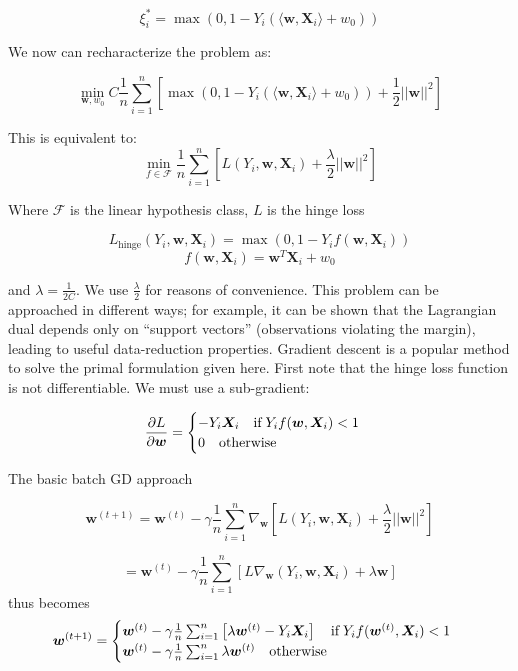 \documentclass{article}
\begin{document}
$$
\xi_i^* = \max(0, 1 - Y_i(\langle \bm{w}, \bm{X}_i \rangle + w_0)) 
$$

We now can recharacterize the problem as:

$$
\min_{\bm{w}, w_0} C \frac{1}{n} \sum_{i=1}^n \left[ \max(0, 1 - Y_i(\langle \bm{w},
\bm{X}_i \rangle +
w_0)) + \frac{1}{2}||\bm{w}||^2 \right]
$$

This is equivalent to:
\begin{equation}
\min_{f \in \mathcal{F}} \frac{1}{n} \sum_{i=1}^n \left[ L(Y_i, \bm{w},
	\bm{X}_i) + \frac{\lambda}{2}
||\bm{w}||^2 \right]
\end{equation}

Where $\mathcal{F}$ is the linear hypothesis class, $L$ is the hinge loss

$$
L_{\mathrm{hinge}}(Y_i, \bm{w}, \bm{X}_i) = \max(0, 1 - Y_i
f(\bm{w}, \bm{X}_i))
$$
$$
f(\bm{w}, \bm{X}_i) = \bm{w}^T\bm{X}_i + w_0
$$

and
$\lambda=\frac{1}{2C}$. We use $\frac{\lambda}{2}$ for reasons of
convenience. This problem can be approached in different ways;
for example, it can be shown that the Lagrangian dual depends only on
``support vectors'' (observations violating the margin), leading to useful
data-reduction properties. Gradient descent is a
popular method to solve the primal formulation given here. First note
that the hinge loss function is not differentiable. We must use a sub-gradient:

\begin{equation}
	\frac{\partial L}{\partial \bm{w}} = 
	\begin{cases}
		-Y_i \bm{X}_i \quad \mathrm{if} \hspace{0.2em} Y_if(\bm{w}, \bm{X}_i) < 1\\
		0 \quad \mathrm{otherwise} \\
	\end{cases}
\end{equation}

The basic batch GD approach

$$
	\bm{w}^{(t+1)} = \bm{w}^{(t)} - \gamma \frac{1}{n} \sum_{i=1}^n
	\nabla_{\bm{w}} \left[ L(Y_i, \bm{w},
	\bm{X}_i) + \frac{\lambda}{2}
||\bm{w}||^2\right]
$$

$$
	= \bm{w}^{(t)} - \gamma \frac{1}{n} \sum_{i=1}^n
	 \left[ L\nabla_{\bm{w}} (Y_i, \bm{w},
	\bm{X}_i) + \lambda \bm{w} \right]
$$
thus becomes
\begin{equation}
	\bm{w}^{(t+1)} = 
	\begin{cases}
		\bm{w}^{(t)} - \gamma \frac{1}{n} \sum_{i=1}^n
		\left[
			\lambda \bm{w}^{(t)} - Y_i\bm{X}_i
		\right]
		\quad \mathrm{if} \hspace{0.2em} Y_if(\bm{w}^{(t)}, \bm{X}_i) < 1 \\

		\bm{w}^{(t)} - \gamma \frac{1}{n} \sum_{i=1}^n
		\lambda \bm{w}^{(t)} 
		\quad \textrm{otherwise} \\

	\end{cases}
\end{equation}
\end{document}
